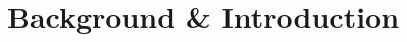 \documentclass[a4paper, 11pt]{report}
\begin{document}
\makeDocumentTitle

\tableofcontents


\part{Background \& Introduction}


\end{document}
